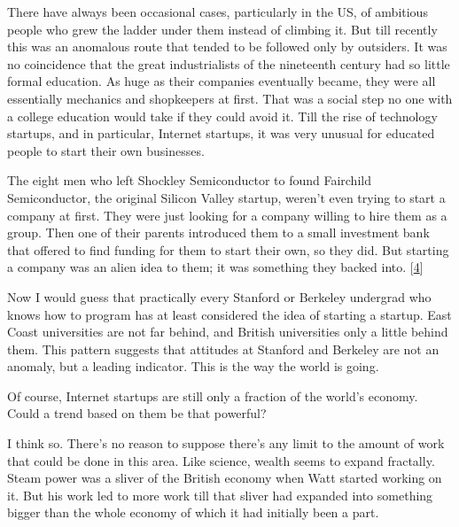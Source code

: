 There
                  have always been occasional cases, particularly in the US, of
                  ambitious people who grew the ladder under them instead of
                  climbing it. But till recently this was an anomalous route
                  that tended to be followed only by outsiders. It was no
                  coincidence that the great industrialists of the nineteenth
                  century had so little formal education. As huge as their
                  companies eventually became, they were all essentially
                  mechanics and shopkeepers at first. That was a social step no
                  one with a college education would take if they could avoid
                  it. Till the rise of technology startups, and in particular,
                  Internet startups, it was very unusual for educated people to
                  start their own businesses.

The eight men who left
                  Shockley Semiconductor to found Fairchild Semiconductor, the
                  original Silicon Valley startup, weren't even trying to start
                  a company at first. They were just looking for a company
                  willing to hire them as a group. Then one of their parents
                  introduced them to a small investment bank that offered to
                  find funding for them to start their own, so they did. But
                  starting a company was an alien idea to them; it was something
                  they backed into.
                  [\href{\#f4n}{4}]

Now I would guess that practically every Stanford
                  or Berkeley undergrad who knows how to program has at least
                  considered the idea of starting a startup. East Coast
                  universities are not far behind, and British universities only
                  a little behind them. This pattern suggests that attitudes at
                  Stanford and Berkeley are not an anomaly, but a leading
                  indicator. This is the way the world is going.

Of
                  course, Internet startups are still only a fraction of the
                  world's economy. Could a trend based on them be that
                  powerful?

I think so. There's no reason to suppose
                  there's any limit to the amount of work that could be done in
                  this area. Like science, wealth seems to expand fractally.
                  Steam power was a sliver of the British economy when Watt
                  started working on it. But his work led to more work till that
                  sliver had expanded into something bigger than the whole
                  economy of which it had initially been a part.

